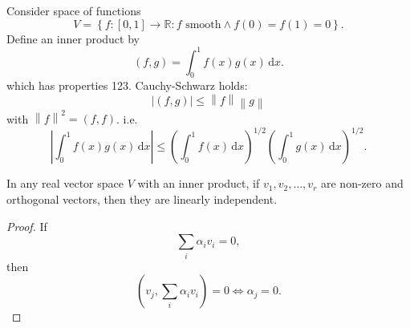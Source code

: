 \documentclass[a4paper]{article}
\begin{document}
\begin{example}
  Consider space of functions
  $$ V=\left\{ f:[0,1]\to \mathbb{R} : f \text{ smooth}\land
  f(0)=f(1)=0\right\} .$$
  Define an inner product by
  \[
    (f,g)=\int_{0}^{1} f(x)g(x) \,\mathrm{d}x
  .\]
  which has properties 123. Cauchy-Schwarz holds:
  \[
    |(f,g)|\le \left\| f \right\| \left\| g \right\|
  \]
  with $ \left\| f \right\|^2 =(f,f) $. i.e.
  \[
    \left| \int_{0}^{1} f(x)g(x) \,\mathrm{d}x \right| \le \left(
    \int_{0}^{1} f(x) \,\mathrm{d}x \right)^{1/2}\left( \int_{0}^{1}
    g(x) \,\mathrm{d}x \right)^{1/2}
  .\]
\end{example}
\begin{lemma}\label{lma:innerprod}
  In any real vector space $V$ with an inner product, if
  $v_1,v_2,\dots,v_r$ are non-zero and orthogonal vectors, then they
  are linearly independent.
\end{lemma}
\begin{proof}
  If
  \[
    \sum_{i}\alpha_i v_i=0
  ,\]
  then
  \[
    (v_j,\sum_{i}\alpha_i v_i)=0 \Longleftrightarrow \alpha_j=0
  .\]
\end{proof}
\end{document}
